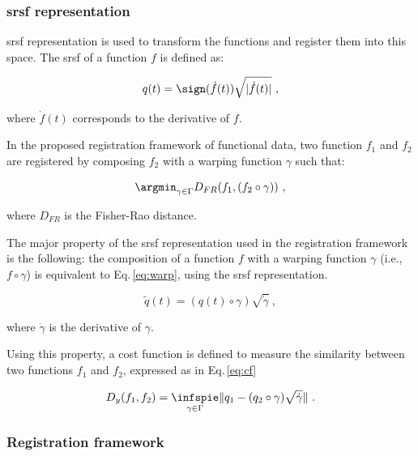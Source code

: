 \subsubsection{\acl*{srsf} representation} \label{sec:srsf}

\Ac{srsf} representation is used to transform the functions and register them into this space. The \ac{srsf} of a function $f$ is defined as:

\begin{equation}
  q(t) = \sign(\dot{f}(t))\sqrt{|\dot{f}(t)|} \ ,
  \label{eq:srsf}
\end{equation}

\noindent where $\dot{f}(t)$ corresponds to the derivative of $f$.

In the proposed registration framework of functional data, two function $f_1$ and $f_2$ are registered by composing $f_2$ with a warping function $\gamma$ such that:

\begin{equation}
  \argmin_{\gamma \in \Gamma} D_{FR}(f_1, (f_2 \circ \gamma)) \ ,
  \label{eq:regfun}
\end{equation}

\noindent where $D_{FR}$ is the Fisher-Rao distance. 

The major property of the \ac{srsf} representation used in the registration framework is the following: the composition of a function $f$ with a warping function $\gamma$ (i.e., $f \circ \gamma$) is equivalent to Eq.\,\ref{eq:warp}, using the \ac{srsf} representation.

\begin{equation}
  \tilde{q}(t) = (q(t) \circ \gamma) \sqrt{\dot{\gamma}} \ ,
  \label{eq:warp}
\end{equation}

\noindent where $\dot{\gamma}$ is the derivative of $\gamma$.

Using this property, a cost function is defined to measure the similarity between two functions $f_1$ and $f_2$, expressed as in Eq.\,\ref{eq:cf}

\begin{equation}
  D_y(f_1, f_2) = \underset{\gamma \in \Gamma}{\infspie} \| q_1 - (q_2 \circ \gamma) \sqrt{\dot{\gamma}} \| \ .
  \label{eq:cf}
\end{equation}

\subsubsection{Registration framework}\label{sec:regfra}

